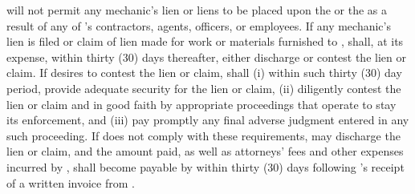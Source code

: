 \lessee will not permit any mechanic's lien or liens to be placed upon the \premises or the \building as a result of any of \lessee's contractors, agents, officers, or employees. If any mechanic's lien is filed or claim of lien made for work or materials furnished to \lessee, \lessee shall, at its expense, within thirty (30) days thereafter, either discharge or contest the lien or claim. If \lessee desires to contest the lien or claim, \lessee shall (i) within such thirty (30) day period, provide \lessor adequate security for the lien or claim, (ii) diligently contest the lien or claim and in good faith by appropriate proceedings that operate to stay its enforcement, and (iii) pay promptly any final adverse judgment entered in any such proceeding. If \lessee does not comply with these requirements, \lessor may discharge the lien or claim, and the amount paid, as well as attorneys' fees and other expenses incurred by \lessor, shall become \additionalRent payable by \lessee within thirty (30) days following \lessee's receipt of a written invoice from \lessor.
